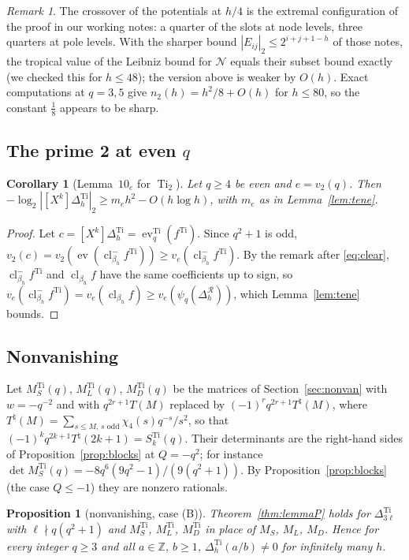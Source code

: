 \documentclass[11pt]{amsart}
\newtheorem{proposition}[theorem]{Proposition}
\newtheorem{corollary}[theorem]{Corollary}
\theoremstyle{definition}
\theoremstyle{remark}
\newtheorem{remark}[theorem]{Remark}
\numberwithin{equation}{section}
\newcommand{\ZZ}{\mathbb{Z}}
\newcommand{\cR}{\mathcal{R}}
\newcommand{\Ti}{\operatorname{Ti}}
\newcommand{\cl}{\operatorname{cl}}
\newcommand{\ev}{\operatorname{ev}}
\begin{document}
\begin{remark}
The crossover of the potentials at $h/4$ is the extremal configuration of the proof in our working notes: a quarter of
the slots at node levels, three quarters at pole levels. With the sharper bound $|E_{ij}|_2\le2^{i+j+1-h}$ of those notes,
the tropical value of the Leibniz bound for $\mathcal N$ equals their subset bound exactly (we checked this for
$h\le48$); the version above is weaker by $O(h)$. Exact computations at $q=3,5$ give $n_2(h)=h^2/8+O(h)$ for $h\le80$, so
the constant $\frac18$ appears to be sharp.
\end{remark}

\subsection{The prime 2 at even \texorpdfstring{$q$}{q}}

\begin{corollary}[Lemma~$10_e$ for $\Ti_2$]\label{cor:teneTi}
Let $q\ge4$ be even and $e=v_2(q)$. Then $-\log_2|[X^k]\Delta^{\Ti}_h|_2\ge m_eh^2-O(h\log h)$, with $m_e$ as in
Lemma~\ref{lem:tene}.
\end{corollary}

\begin{proof}
Let $c=[X^k]\Delta^{\Ti}_h=\ev^{\Ti}_q(f^{\Ti})$. Since $q^2+1$ is odd, $v_2(c)=v_2(\ev(\cl^-_{\beta_h}f^{\Ti}))\ge v_e(\cl^-_{\beta_h}f^{\Ti})$.
By the remark after \eqref{eq:clear}, $\cl^-_{\beta_h}f^{\Ti}$ and $\cl_{\beta_h}f$ have the same coefficients up to sign, so
$v_e(\cl^-_{\beta_h}f^{\Ti})=v_e(\cl_{\beta_h}f)\ge v_e(\psi_q(\Delta^{\cR}_h))$, which Lemma~\ref{lem:tene} bounds.
\end{proof}

\subsection{Nonvanishing}
Let $M^{\Ti}_S(q)$, $M^{\Ti}_L(q)$, $M^{\Ti}_D(q)$ be the matrices of Section~\ref{sec:nonvan} with $w=-q^{-2}$ and with $q^{2r+1}T(M)$
replaced by $(-1)^rq^{2r+1}T^\natural(M)$, where $T^\natural(M)=\sum_{s\le M,\,s\text{ odd}}\chi_4(s)q^{-s}/s^2$, so that
$(-1)^kq^{2k+1}T^\natural(2k+1)=S^{\Ti}_k(q)$. Their determinants are the right-hand sides of
Proposition~\ref{prop:blocks} at $Q=-q^2$; for instance $\det M^{\Ti}_S(q)=-8q^6(9q^2-1)/(9(q^2+1))$. By
Proposition~\ref{prop:blocks} (the case $Q\le-1$) they are nonzero rationals.

\begin{proposition}[nonvanishing, case (B)]\label{prop:nonvanB}
Theorem~\ref{thm:lemmaP} holds for $\Delta^{\Ti}_{3\ell}$ with $\ell\nmid q(q^2+1)$ and $M^{\Ti}_S$, $M^{\Ti}_L$, $M^{\Ti}_D$
in place of $M_S$, $M_L$, $M_D$. Hence for every integer $q\ge3$ and all $a\in\ZZ$, $b\ge1$, $\Delta^{\Ti}_h(a/b)\ne0$ for
infinitely many $h$.
\end{proposition}
\end{document}
